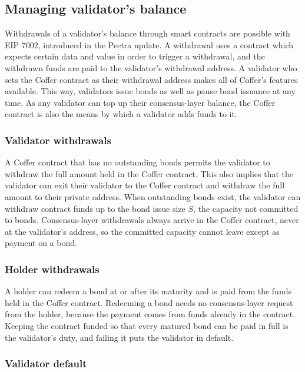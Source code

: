 \documentclass{article}
\begin{document}
\subsection{Managing validator's balance}

Withdrawals of a validator's balance through smart contracts are possible with EIP 7002, introduced in the Pectra update. A withdrawal uses a contract which expects certain data and value in order to trigger a withdrawal, and the withdrawn funds are paid to the validator's withdrawal address. A validator who sets the Coffer contract as their withdrawal address makes all of Coffer's features available. This way, validators issue bonds as well as pause bond issuance at any time. As any validator can top up their consensus-layer balance, the Coffer contract is also the means by which a validator adds funds to it.

\subsubsection{Validator withdrawals}

A Coffer contract that has no outstanding bonds permits the validator to withdraw the full amount held in the Coffer contract. This also implies that the validator can exit their validator to the Coffer contract and withdraw the full amount to their private address. When outstanding bonds exist, the validator can withdraw contract funds up to the bond issue size \(S\), the capacity not committed to bonds. Consensus-layer withdrawals always arrive in the Coffer contract, never at the validator's address, so the committed capacity cannot leave except as payment on a bond.

\subsubsection{Holder withdrawals}

A holder can redeem a bond at or after its maturity and is paid from the funds held in the Coffer contract. Redeeming a bond needs no consensus-layer request from the holder, because the payment comes from funds already in the contract. Keeping the contract funded so that every matured bond can be paid in full is the validator's duty, and failing it puts the validator in default.

\subsubsection{Validator default}
\end{document}
